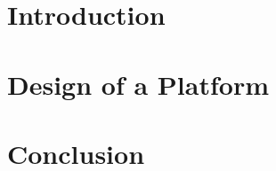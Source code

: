 \documentclass[twoside]{ctuthesis}
\theoremstyle{plain}
\theoremstyle{definition}
\theoremstyle{note}
\begin{document}
\maketitle

\printglossary[type=\acronymtype]
\printunsrtglossary[title=Acronyms]

\chapter{Introduction}


\chapter{Design of a Platform}




\chapter{Conclusion}


\appendix

\printindex



\printbibliography[title={Bibliography}]
\thispagestyle{plain}

\end{document}
